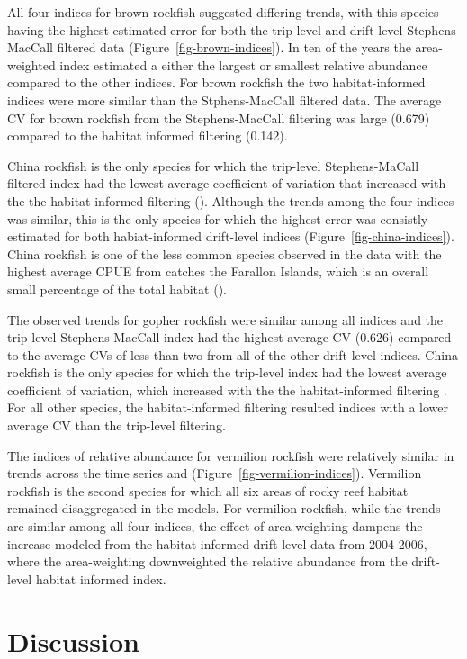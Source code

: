 \documentclass[
  12pt,
  authoryear,
  preprint,
  3p]{elsarticle}
\begin{document}
All four indices for brown rockfish suggested differing trends, with
this species having the highest estimated error for both the trip-level
and drift-level Stephens-MacCall filtered data
(Figure~\ref{fig-brown-indices}). In ten of the years the area-weighted
index estimated a either the largest or smallest relative abundance
compared to the other indices. For brown rockfish the two
habitat-informed indices were more similar than the Stphens-MacCall
filtered data. The average CV for brown rockfish from the
Stephens-MacCall filtering was large (0.679) compared to the habitat
informed filtering (0.142).

China rockfish is the only species for which the trip-level
Stephens-MaCall filtered index had the lowest average coefficient of
variation that increased with the the habitat-informed filtering
(\citet{tab-avgcv}). Although the trends among the four indices was
similar, this is the only species for which the highest error was
consistly estimated for both habiat-informed drift-level indices
(Figure~\ref{fig-china-indices}). China rockfish is one of the less
common species observed in the data with the highest average CPUE from
catches the Farallon Islands, which is an overall small percentage of
the total habitat (\citet{tab-reefareas}).

The observed trends for gopher rockfish were similar among all indices
and the trip-level Stephens-MacCall index had the highest average CV
(0.626) compared to the average CVs of less than two from all of the
other drift-level indices. China rockfish is the only species for which
the trip-level index had the lowest average coefficient of variation,
which increased with the the habitat-informed filtering . For all other
species, the habitat-informed filtering resulted indices with a lower
average CV than the trip-level filtering.

The indices of relative abundance for vermilion rockfish were relatively
similar in trends across the time series and
(Figure~\ref{fig-vermilion-indices}). Vermilion rockfish is the second
species for which all six areas of rocky reef habitat remained
disaggregated in the models. For vermilion rockfish, while the trends
are similar among all four indices, the effect of area-weighting dampens
the increase modeled from the habitat-informed drift level data from
2004-2006, where the area-weighting downweighted the relative abundance
from the drift-level habitat informed index.

\FloatBarrier

\hypertarget{discussion}{%
\section{Discussion}\label{discussion}}
\end{document}
